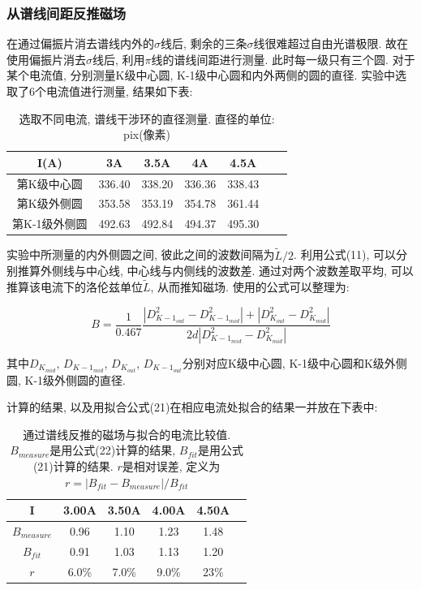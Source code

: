\documentclass[12pt,a4paper]{article}
\newcommand{\be}[1]{
    \begin{equation}
        #1
    \end{equation}
}
\begin{document}
\subsubsection{从谱线间距反推磁场}
在通过偏振片消去谱线内外的$\sigma$线后, 剩余的三条$\sigma$线很难超过自由光谱极限. 故在使用偏振片消去$\sigma$线后, 利用$\pi$线的谱线间距进行测量. 
此时每一级只有三个圆. 对于某个电流值, 分别测量K级中心圆, K-1级中心圆和内外两侧的圆的直径. 
实验中选取了6个电流值进行测量, 结果如下表: 
\begin{table}[H]
    \centering
    \begin{tabular}{|c|c|c|c|c|c|c|}
    \hline
    I(A)&3A&3.5A&4A&4.5A\\ \hline
    第K级中心圆&336.40&338.20&336.36&338.43\\ \hline
    第K级外侧圆&353.58&353.19&354.78&361.44\\ \hline
    第K-1级外侧圆&492.63&492.84&494.37&495.30\\ \hline
    \end{tabular}
    \caption{选取不同电流, 谱线干涉环的直径测量. 直径的单位: pix(像素)}
    \end{table}


实验中所测量的内外侧圆之间, 彼此之间的波数间隔为$\widetilde{L}/2$. 利用公式(11), 可以分别推算外侧线与中心线, 中心线与内侧线的波数差. 通过对两个波数差取平均, 可以推算该电流下的洛伦兹单位$\widetilde{L}$, 
从而推知磁场. 
使用的公式可以整理为: 
\be{B=\frac{1}{0.467}\frac{\left |D_{K-1_{out}}^2-D_{K-1_{mid}}^2\right | + \left |D_{K_{out}}^2-D_{K_{mid}}^2\right |}{2d\left |D_{K-1_{mid}}^2-D_{K_{mid}}^2\right|}}

其中$D_{K_{mid}}$, $D_{K-1_{mid}}$, $D_{K_{out}}$, $D_{K-1_{out}}$分别对应K级中心圆, K-1级中心圆和K级外侧圆, K-1级外侧圆的直径.

计算的结果, 以及用拟合公式(21)在相应电流处拟合的结果一并放在下表中: 
\begin{table}[H]
    \centering
    \begin{tabular}{|c|c|c|c|c|c|}
    \hline
    I&3.00A&3.50A&4.00A&4.50A\\ \hline
    $B_{measure}$ & 0.96 & 1.10 & 1.23 & 1.48 \\ \hline
    $B_{fit}$     & 0.91 &1.03 & 1.13 & 1.20\\ \hline
    $r$ & 6.0\%	&7.0\%	&9.0\% &	23\%\\ \hline

    \end{tabular}
    \caption{通过谱线反推的磁场与拟合的电流比较值. $B_{measure}$是用公式(22)计算的结果, $B_{fit}$是用公式(21)计算的结果. $r$是相对误差, 定义为$r=\left | B_{fit}-B_{measure}\right |/B_{fit}$}
    \end{table}
\end{document}
